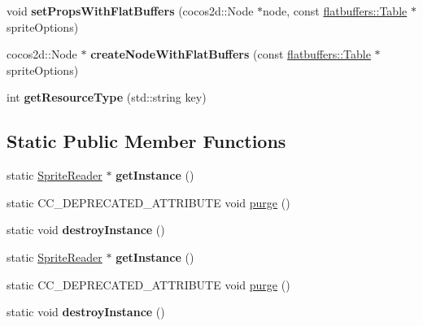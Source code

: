 \begin{DoxyCompactItemize}
void {\bfseries set\+Props\+With\+Flat\+Buffers} (cocos2d\+::\+Node $\ast$node, const \hyperlink{classflatbuffers_1_1Table}{flatbuffers\+::\+Table} $\ast$sprite\+Options)
\item 
\mbox{\label{classcocostudio_1_1SpriteReader_a1d36064e5cfe0d7cf5d91f63444892cb}} 
cocos2d\+::\+Node $\ast$ {\bfseries create\+Node\+With\+Flat\+Buffers} (const \hyperlink{classflatbuffers_1_1Table}{flatbuffers\+::\+Table} $\ast$sprite\+Options)
\item 
\mbox{\label{classcocostudio_1_1SpriteReader_ab82e62ddc3b4b62ceff881c676a3cea2}} 
int {\bfseries get\+Resource\+Type} (std\+::string key)
\end{DoxyCompactItemize}
\subsection*{Static Public Member Functions}
\begin{DoxyCompactItemize}
\item 
\mbox{\label{classcocostudio_1_1SpriteReader_aed12f428052988ccaeb663c93fcbd6d4}} 
static \hyperlink{classcocostudio_1_1SpriteReader}{Sprite\+Reader} $\ast$ {\bfseries get\+Instance} ()
\item 
static C\+C\+\_\+\+D\+E\+P\+R\+E\+C\+A\+T\+E\+D\+\_\+\+A\+T\+T\+R\+I\+B\+U\+TE void \hyperlink{classcocostudio_1_1SpriteReader_a92d206fdf2e9d6127be5cdfd4d4841d4}{purge} ()
\item 
\mbox{\label{classcocostudio_1_1SpriteReader_a58b5fbcfc9cb843385ebc5fde7aec4dc}} 
static void {\bfseries destroy\+Instance} ()
\item 
\mbox{\label{classcocostudio_1_1SpriteReader_ab410725f8facb23f5eac608aa2a749b2}} 
static \hyperlink{classcocostudio_1_1SpriteReader}{Sprite\+Reader} $\ast$ {\bfseries get\+Instance} ()
\item 
static C\+C\+\_\+\+D\+E\+P\+R\+E\+C\+A\+T\+E\+D\+\_\+\+A\+T\+T\+R\+I\+B\+U\+TE void \hyperlink{classcocostudio_1_1SpriteReader_a113f0de09d0a7bcfb250466df232e891}{purge} ()
\item 
\mbox{\label{classcocostudio_1_1SpriteReader_a5d6af386055c5ece0a19d391ddef927c}} 
static void {\bfseries destroy\+Instance} ()
\end{DoxyCompactItemize}


